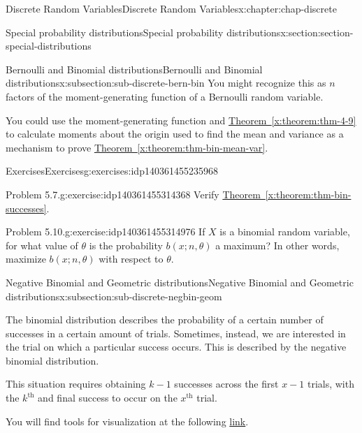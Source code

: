 \documentclass[oneside,10pt,]{book}
\newcommand{\xreffont}{\relax}
\numberwithin{equation}{section}
\begin{document}
\begin{chapterptx}{Discrete Random Variables}{}{Discrete Random Variables}{}{}{x:chapter:chap-discrete}
\begin{sectionptx}{Special probability distributions}{}{Special probability distributions}{}{}{x:section:section-special-distributions}
\begin{subsectionptx}{Bernoulli and Binomial distributions}{}{Bernoulli and Binomial distributions}{}{}{x:subsection:sub-discrete-bern-bin}
You might recognize this as \(n\) factors of the moment-generating function of a Bernoulli random variable.%
\par
You could use the moment-generating function and \hyperref[x:theorem:thm-4-9]{Theorem~{\xreffont\ref{x:theorem:thm-4-9}}} to calculate moments about the origin used to find the mean and variance as a mechanism to prove \hyperref[x:theorem:thm-bin-mean-var]{Theorem~{\xreffont\ref{x:theorem:thm-bin-mean-var}}}.%
\end{subsectionptx}
%
%
\typeout{************************************************}
\typeout{************************************************}
%
\begin{exercises-subsection}{Exercises}{}{Exercises}{}{}{g:exercises:idp140361455235968}
\begin{divisionexercise}{1}{Problem 5.7.}{}{g:exercise:idp140361455314368}%
Verify \hyperref[x:theorem:thm-bin-successes]{Theorem~{\xreffont\ref{x:theorem:thm-bin-successes}}}.%
\end{divisionexercise}%
\begin{divisionexercise}{2}{Problem 5.10.}{}{g:exercise:idp140361455314976}%
If \(X\) is a binomial random variable, for what value of \(\theta\) is the probability \(b(x; n, \theta)\) a maximum? In other words, maximize \(b(x; n, \theta)\) with respect to \(\theta\).%
\end{divisionexercise}%
\end{exercises-subsection}
%
%
\typeout{************************************************}
\typeout{************************************************}
%
\begin{subsectionptx}{Negative Binomial and Geometric distributions}{}{Negative Binomial and Geometric distributions}{}{}{x:subsection:sub-discrete-negbin-geom}
\begin{introduction}{}%
The binomial distribution describes the probability of a certain number of successes in a certain amount of trials. Sometimes, instead, we are interested in the trial on which a particular success occurs.  This is described by the negative binomial distribution.%
\par
This situation requires obtaining \(k-1\) successes across the first \(x-1\) trials, with the \(k^{\text{th}}\) and final success to occur on the \(x^{\text{th}}\) trial.%
\par
You will find tools for visualization at the following \href{https://buddy.uco.edu/shiny/slaverty/mathstat/NegBin/}{link}.%

\end{introduction}
\end{subsectionptx}
\end{sectionptx}
\end{chapterptx}
\end{document}
